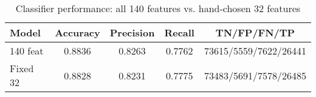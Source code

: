 \begin{table}[htbp]\centering\scriptsize
\caption{Classifier performance: all 140 features vs. hand-chosen 32 features}\label{tab:metrics140vs32}
\begin{tabular}{lcccc}\toprule
Model & Accuracy & Precision & Recall & TN/FP/FN/TP \\\midrule
140 feat & 0.8836 & 0.8263 & 0.7762 & 73615/5559/7622/26441 \\
Fixed 32 & 0.8828 & 0.8231 & 0.7775 & 73483/5691/7578/26485 \\
\bottomrule\end{tabular}\end{table}
